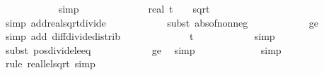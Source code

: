 \begin{isabellebody}
\ \ \ \ \ \ \ \ \ \ \isamarkupfalse%
\ simp\isanewline
\ \ \ \ \ \ \ \ \isamarkupfalse%
\ \isamarkupfalse%
\ {\isachardoublequoteopen}{\isachardot}{\kern0pt}{\isachardot}{\kern0pt}{\isachardot}{\kern0pt}\ {\isacharequal}{\kern0pt}\ real\ t\ {\isacharplus}{\kern0pt}\ {\isacharparenleft}{\kern0pt}{}\ {\isacharasterisk}{\kern0pt}\ sqrt{\isacharparenleft}{\kern0pt}{}{}{\isacharparenright}{\kern0pt}\ {\isacharminus}{\kern0pt}\ {}{}{\isacharparenright}{\kern0pt}{\isacharslash}{\kern0pt}\ {\isasymdelta}{\isacharprime}{\kern0pt}{\isachardoublequoteclose}\isanewline
\ \ \ \ \ \ \ \ \ \ \isamarkupfalse%
\ {\isacharparenleft}{\kern0pt}simp\ add{\isacharcolon}{\kern0pt}real{\isacharunderscore}{\kern0pt}sqrt{\isacharunderscore}{\kern0pt}divide{\isacharparenright}{\kern0pt}\isanewline
\ \ \ \ \ \ \ \ \ \ \isamarkupfalse%
\ {\isacharparenleft}{\kern0pt}subst\ abs{\isacharunderscore}{\kern0pt}of{\isacharunderscore}{\kern0pt}nonneg{\isacharparenright}{\kern0pt}\isanewline
\ \ \ \ \ \ \ \ \ \ \isamarkupfalse%
\ {\isasymdelta}{\isacharprime}{\kern0pt}{\isacharunderscore}{\kern0pt}ge{\isacharunderscore}{\kern0pt}{}\ \isamarkupfalse%
\ {\isacharparenleft}{\kern0pt}simp\ add{\isacharcolon}{\kern0pt}\ diff{\isacharunderscore}{\kern0pt}divide{\isacharunderscore}{\kern0pt}distrib{\isacharparenright}{\kern0pt}{\isacharplus}{\kern0pt}\isanewline
\ \ \ \ \ \ \ \ \isamarkupfalse%
\ \isamarkupfalse%
\ {\isachardoublequoteopen}{\isachardot}{\kern0pt}{\isachardot}{\kern0pt}{\isachardot}{\kern0pt}\ {\isasymle}\ t{\isachardoublequoteclose}\isanewline
\ \ \ \ \ \ \ \ \ \ \isamarkupfalse%
\ simp\isanewline
\ \ \ \ \ \ \ \ \ \ \isamarkupfalse%
\ {\isacharparenleft}{\kern0pt}subst\ pos{\isacharunderscore}{\kern0pt}divide{\isacharunderscore}{\kern0pt}le{\isacharunderscore}{\kern0pt}eq{\isacharparenright}{\kern0pt}\isanewline
\ \ \ \ \ \ \ \ \ \ \isamarkupfalse%
\ {\isasymdelta}{\isacharprime}{\kern0pt}{\isacharunderscore}{\kern0pt}ge{\isacharunderscore}{\kern0pt}{}\ \isamarkupfalse%
\ simp\ \isanewline
\ \ \ \ \ \ \ \ \ \ \isamarkupfalse%
\ simp\isanewline
\ \ \ \ \ \ \ \ \ \ \isamarkupfalse%
\ {\isacharparenleft}{\kern0pt}rule\ real{\isacharunderscore}{\kern0pt}le{\isacharunderscore}{\kern0pt}lsqrt{\isacharcomma}{\kern0pt}\ simp{\isacharplus}{\kern0pt}{\isacharparenright}{\kern0pt}\isanewline

\end{isabellebody}

